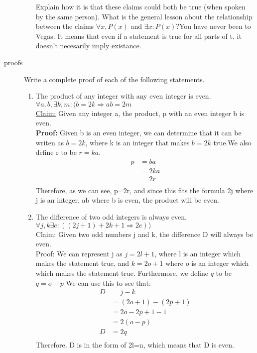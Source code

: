 \documentclass{letter}
\theoremstyle{definition}
\begin{document}
\begin{description}
\begin{enumerate}
			Explain how it is that these claims could both be true (when spoken by the same person). What is the general lesson about the relationship between the claims $\forall x, P(x)$ and $\exists x: P(x)$?You have never been to Vegas. It means that even if a statement is true for all parts of t, it doesn't necesarily imply existance.
\end{enumerate}
\item[proofs] Write a complete proof of each of the following statements.
	\begin{enumerate}
		\item The product of any integer with any even integer is even.
$\forall a, b,\exists k, m:(b=2k \Rightarrow ab=2m$ \\
\underline{Claim:} Given any integer a, the product, p with an even integer b is even. \\
\textbf{Proof:} Given b is an even integer, we can determine that it can be writen as $b=2k$, where k is an integer that makes $b=2k$ true.We also define r to be $r=ka$.
\begin{align*}
p &= ba \\
 &= 2ka \tag{Replaces b with 2k} \\
 &= 2r \tag{Uses r to represent ka} \\
\end{align*} 
Therefore, as we can see, p=2r, and since this fits the formula 2j where j is an integer, ab where b is even, the product will be even.
		\item The difference of two odd integers is always even.
$  \forall j, k \exists e:((2j+1)+2k+1 \Rightarrow 2e)) $ \\
Claim: Given two odd numbers j and k, the difference D will always be even. \\
Proof: We can represent j as $j=2l+1$, where l is an integer which makes the statement true, and $k=2o+1$ where $o$ is an integer which which makes the statement true. Furthermore, we define $q$ to be $q=o-p$ We can use this to see that:
\begin{align*}
D &= j-k \\
&= (2o+1)-(2p+1) \tag{Replaced j with 2o+1 and k with 2p+1} \\
&= 2o-2p+1-1 \tag{distributed negative one} \\
&= 2(o-p) \tag{Subtracted ones and factored out 2.} \\
D &= 2q \tag{rewrote (o-p) as q} \\
\end{align*}
Therefore, D is in the form of 2l=n, which means that D is even. \\

\end{enumerate}
\end{description}
\end{document}
